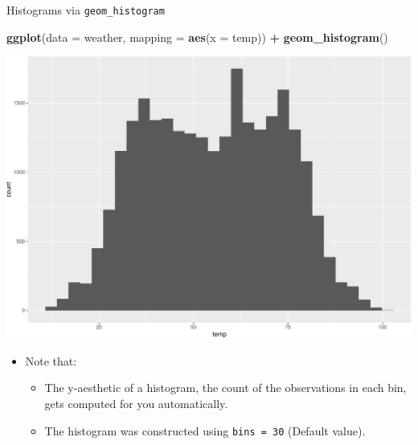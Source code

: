 \documentclass[
  ignorenonframetext,
]{beamer}
\newenvironment{Shaded}{\begin{snugshade}}{\end{snugshade}}
\newcommand{\AttributeTok}[1]{\textcolor[rgb]{0.13,0.29,0.53}{#1}}
\newcommand{\FunctionTok}[1]{\textcolor[rgb]{0.13,0.29,0.53}{\textbf{#1}}}
\newcommand{\NormalTok}[1]{#1}
\newcommand{\SpecialCharTok}[1]{\textcolor[rgb]{0.81,0.36,0.00}{\textbf{#1}}}
\providecommand{\tightlist}{%
  \setlength{\itemsep}{0pt}\setlength{\parskip}{0pt}}
\begin{document}
\begin{frame}[fragile]{Histograms via \texttt{geom\_histogram}}
\protect\hypertarget{histograms-via-geom_histogram}{}
\tiny

\begin{Shaded}
\begin{Highlighting}[]
\FunctionTok{ggplot}\NormalTok{(}\AttributeTok{data =}\NormalTok{ weather, }\AttributeTok{mapping =} \FunctionTok{aes}\NormalTok{(}\AttributeTok{x =}\NormalTok{ temp)) }\SpecialCharTok{+}
  \FunctionTok{geom\_histogram}\NormalTok{()}
\end{Highlighting}
\end{Shaded}

\begin{center}\includegraphics[width=0.7\linewidth,height=0.5\textheight]{Week2_files/figure-beamer/unnamed-chunk-26-1} \end{center}
\normalsize

\begin{itemize}
\item
  Note that:

  \begin{itemize}
  \tightlist
  \item
    The y-aesthetic of a histogram, the count of the observations in
    each bin, gets computed for you automatically.
  \item
    The histogram was constructed using \texttt{bins\ =\ 30} (Default
    value).
  \end{itemize}
\end{itemize}
\end{frame}
\end{document}
